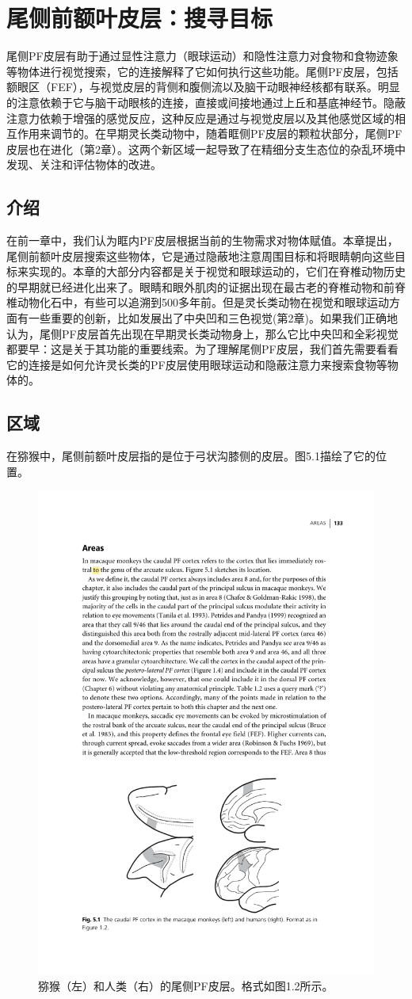 \chapter{尾侧前额叶皮层：搜寻目标} \label{chap:chap5}
尾侧PF皮层有助于通过显性注意力（眼球运动）和隐性注意力对食物和食物迹象等物体进行视觉搜索，它的连接解释了它如何执行这些功能。尾侧PF皮层，包括额眼区（FEF），与视觉皮层的背侧和腹侧流以及脑干动眼神经核都有联系。明显的注意依赖于它与脑干动眼核的连接，直接或间接地通过上丘和基底神经节。隐蔽注意力依赖于增强的感觉反应，这种反应是通过与视觉皮层以及其他感觉区域的相互作用来调节的。在早期灵长类动物中，随着眶侧PF皮层的颗粒状部分，尾侧PF皮层也在进化（第2章）。这两个新区域一起导致了在精细分支生态位的杂乱环境中发现、关注和评估物体的改进。

\section{介绍}
在前一章中，我们认为眶内PF皮层根据当前的生物需求对物体赋值。本章提出，尾侧前额叶皮层搜索这些物体，它是通过隐蔽地注意周围目标和将眼睛朝向这些目标来实现的。本章的大部分内容都是关于视觉和眼球运动的，它们在脊椎动物历史的早期就已经进化出来了。眼睛和眼外肌肉的证据出现在最古老的脊椎动物和前脊椎动物化石中，有些可以追溯到500多年前\cite{Shu et al. 2003}。但是灵长类动物在视觉和眼球运动方面有一些重要的创新，比如发展出了中央凹和三色视觉(第2章)。如果我们正确地认为，尾侧PF皮层首先出现在早期灵长类动物身上，那么它比中央凹和全彩视觉都要早：这是关于其功能的重要线索。为了理解尾侧PF皮层，我们首先需要看看它的连接是如何允许灵长类的PF皮层使用眼球运动和隐蔽注意力来搜索食物等物体的。
\section{区域}
在猕猴中，尾侧前额叶皮层指的是位于弓状沟膝侧的皮层。图5.1描绘了它的位置。
\begin{figure}
	\centering
	\includegraphics[width=0.7\linewidth]{image_pfc/Fig_5_1}
	\caption{猕猴（左）和人类（右）的尾侧PF皮层。格式如图1.2所示。}
	\label{fig:fig}
\end{figure}

